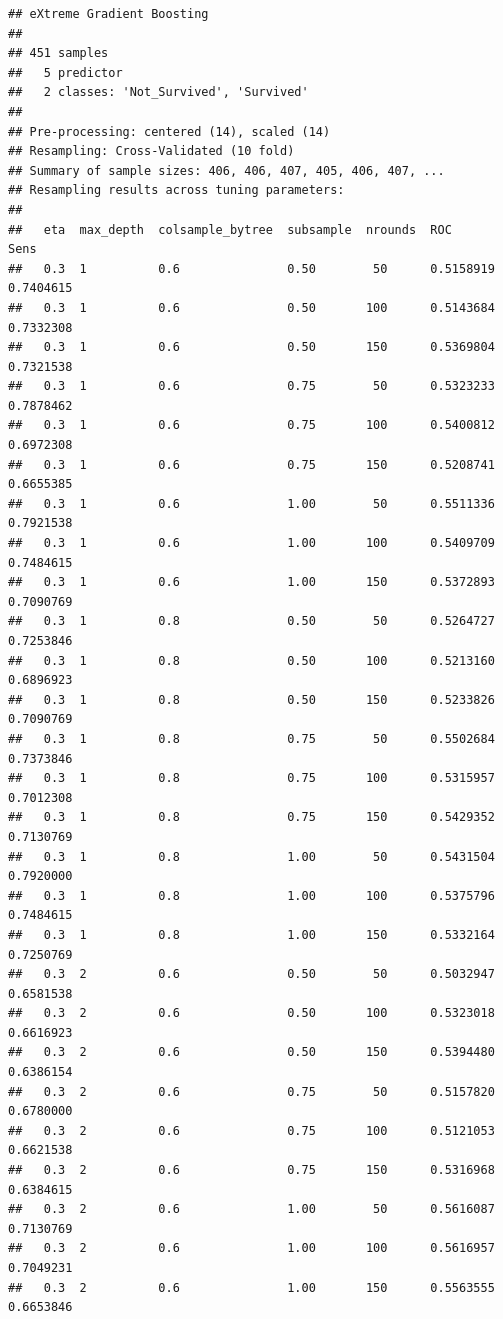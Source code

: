 \documentclass[
  11pt,
]{article}
\begin{document}
\begin{verbatim}
## eXtreme Gradient Boosting 
## 
## 451 samples
##   5 predictor
##   2 classes: 'Not_Survived', 'Survived' 
## 
## Pre-processing: centered (14), scaled (14) 
## Resampling: Cross-Validated (10 fold) 
## Summary of sample sizes: 406, 406, 407, 405, 406, 407, ... 
## Resampling results across tuning parameters:
## 
##   eta  max_depth  colsample_bytree  subsample  nrounds  ROC        Sens     
##   0.3  1          0.6               0.50        50      0.5158919  0.7404615
##   0.3  1          0.6               0.50       100      0.5143684  0.7332308
##   0.3  1          0.6               0.50       150      0.5369804  0.7321538
##   0.3  1          0.6               0.75        50      0.5323233  0.7878462
##   0.3  1          0.6               0.75       100      0.5400812  0.6972308
##   0.3  1          0.6               0.75       150      0.5208741  0.6655385
##   0.3  1          0.6               1.00        50      0.5511336  0.7921538
##   0.3  1          0.6               1.00       100      0.5409709  0.7484615
##   0.3  1          0.6               1.00       150      0.5372893  0.7090769
##   0.3  1          0.8               0.50        50      0.5264727  0.7253846
##   0.3  1          0.8               0.50       100      0.5213160  0.6896923
##   0.3  1          0.8               0.50       150      0.5233826  0.7090769
##   0.3  1          0.8               0.75        50      0.5502684  0.7373846
##   0.3  1          0.8               0.75       100      0.5315957  0.7012308
##   0.3  1          0.8               0.75       150      0.5429352  0.7130769
##   0.3  1          0.8               1.00        50      0.5431504  0.7920000
##   0.3  1          0.8               1.00       100      0.5375796  0.7484615
##   0.3  1          0.8               1.00       150      0.5332164  0.7250769
##   0.3  2          0.6               0.50        50      0.5032947  0.6581538
##   0.3  2          0.6               0.50       100      0.5323018  0.6616923
##   0.3  2          0.6               0.50       150      0.5394480  0.6386154
##   0.3  2          0.6               0.75        50      0.5157820  0.6780000
##   0.3  2          0.6               0.75       100      0.5121053  0.6621538
##   0.3  2          0.6               0.75       150      0.5316968  0.6384615
##   0.3  2          0.6               1.00        50      0.5616087  0.7130769
##   0.3  2          0.6               1.00       100      0.5616957  0.7049231
##   0.3  2          0.6               1.00       150      0.5563555  0.6653846

\end{verbatim}
\end{document}
